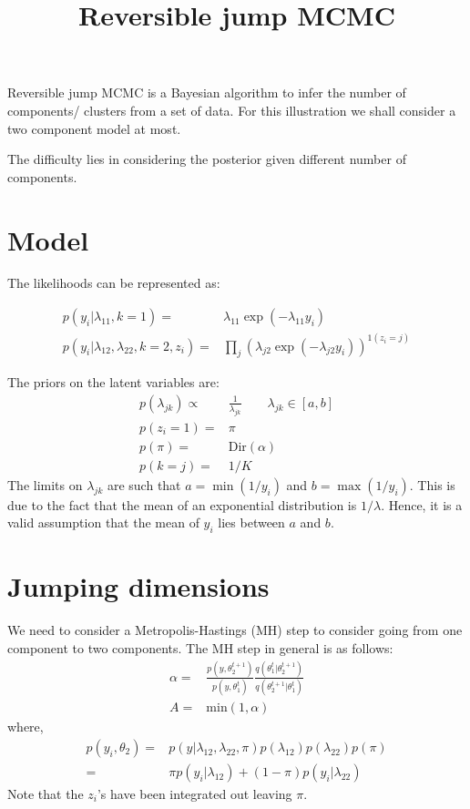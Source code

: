 \documentclass{article}
\title{Reversible jump MCMC}
\date{}
\begin{document}
\maketitle




Reversible jump MCMC is a Bayesian algorithm to infer the number of components/ clusters from a set of data. For this illustration we shall consider a two component model at most.

The difficulty lies in considering the posterior given different number of components.

\section{Model}
The likelihoods can be represented as:

\begin{align}
p(y_i|\lambda_{11},k=1)=&\lambda_{11}\exp(-\lambda_{11}y_i)\\
p(y_i|\lambda_{12},\lambda_{22},k=2,z_i)=&\prod_j (\lambda_{j2}\exp(-\lambda_{j2}y_i))^{1(z_i=j)}
\end{align}


The priors on the latent variables are:
\begin{align}
p(\lambda_{jk})\propto & \frac{1}{\lambda_{jk}}\qquad \lambda_{jk}\in[a,b]\\
p(z_i=1)=&\pi\\
p(\pi) = & \text{Dir}(\alpha)\\
p(k=j)= & 1/K
\end{align}
The limits on $\lambda_{jk}$ are such that $a=\min(1/y_i)$ and $b=\max(1/y_i)$. This is due to the fact that the mean of an exponential distribution is $1/\lambda$. Hence, it is a valid assumption that the mean of $y_i$ lies between $a$ and $b$.

\section{Jumping dimensions}
We need to consider a Metropolis-Hastings (MH) step to consider going from one component to two components. The MH step in general is as follows:
\begin{align}
\alpha = & \frac{p(y,\theta_2^{t+1})}{p(y,\theta_1^t)}\frac{q(\theta_1^t|\theta_2^{t+1})}{q(\theta_2^{t+1}|\theta_1^{t})}\\
A = & \text{min}\left(1,\alpha\right)
\end{align}
where,
\begin{align}
p(y_i,\theta_2)=& p(y|\lambda_{12},\lambda_{22},\pi)p(\lambda_{12})p(\lambda_{22})p(\pi)\\
=&\pi p(y_i|\lambda_{12})+(1-\pi) p(y_i|\lambda_{22})
\end{align}
Note that the $z_i$'s have been integrated out leaving $\pi$.
\end{document}
